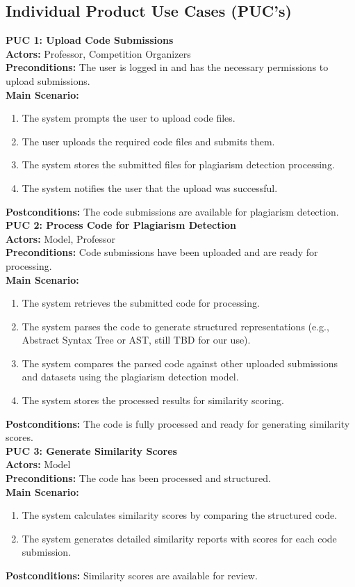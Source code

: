 \documentclass[12pt]{article}
\begin{document}
\subsection{Individual Product Use Cases (PUC's)}
\textbf{PUC 1: Upload Code Submissions}\\
\textbf{Actors:} Professor, Competition Organizers\\
\textbf{Preconditions:} The user is logged in and has the necessary permissions to upload submissions.\\
\textbf{Main Scenario:}
\begin{enumerate}
    \item The system prompts the user to upload code files.
    \item The user uploads the required code files and submits them.
    \item The system stores the submitted files for plagiarism detection processing.
    \item The system notifies the user that the upload was successful.
\end{enumerate}
\textbf{Postconditions:} The code submissions are available for plagiarism detection.\\[0.2cm]

\textbf{PUC 2: Process Code for Plagiarism Detection}\\
\textbf{Actors:} Model, Professor\\
\textbf{Preconditions:} Code submissions have been uploaded and are ready for processing.\\
\textbf{Main Scenario:}
\begin{enumerate}
    \item The system retrieves the submitted code for processing.
    \item The system parses the code to generate structured representations (e.g., Abstract Syntax Tree or AST, still TBD for our use).
    \item The system compares the parsed code against other uploaded submissions and datasets using the plagiarism detection model.
    \item The system stores the processed results for similarity scoring.
\end{enumerate}
\textbf{Postconditions:} The code is fully processed and ready for generating similarity scores.\\[0.2cm]

\textbf{PUC 3: Generate Similarity Scores}\\
\textbf{Actors:} Model\\
\textbf{Preconditions:} The code has been processed and structured.\\
\textbf{Main Scenario:}
\begin{enumerate}
    \item The system calculates similarity scores by comparing the structured code.
    \item The system generates detailed similarity reports with scores for each code submission.
\end{enumerate}
\textbf{Postconditions:} Similarity scores are available for review.\\[0.2cm]
\end{document}
